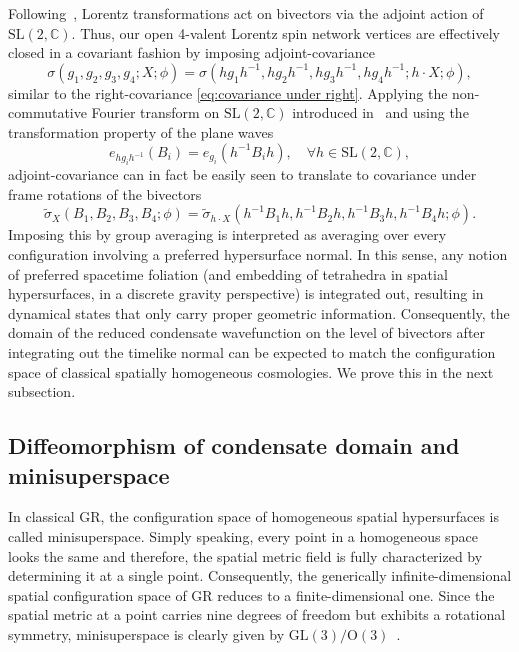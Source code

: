 \documentclass[11pt,a4paper]{article}
\newcommand{\C}{\mathbb C}
\newcommand{\SL}{\text{SL$(2,\C)$}}
\begin{document}
Following~\cite{Gielen:2013naa}, Lorentz transformations act on bivectors via the adjoint action of $\SL$. Thus, our open 4-valent Lorentz spin network vertices are effectively closed in a covariant fashion by imposing adjoint-covariance
%
\begin{equation}\label{eq:covariance under adjoint}
\sigma(g_1, g_2, g_3, g_4;X;\phi)
=
\sigma(hg_1 h^{-1}, hg_2 h^{-1}, hg_3 h^{-1}, hg_4 h^{-1};h\cdot X;\phi),
\end{equation}
%
similar to the right-covariance \eqref{eq:covariance under right}. Applying the non-commutative Fourier transform on $\SL$ introduced in~\cite{Oriti:2018bwr} and using the transformation property of the plane waves
%
\begin{equation}\label{eq:adjoint on group is adoint on bivectors}
e_{hg_ih^{-1}}(B_i)
=
e_{g_i}(h^{-1} B_i h),\quad\forall h\in\SL,
\end{equation}
%
adjoint-covariance can in fact be easily seen to translate to covariance under frame rotations of the bivectors
%
\begin{equation}
\tilde{\sigma}_X(B_1, B_2, B_3, B_4;\phi)
=
\tilde{\sigma}_{h\cdot X}(h^{-1}B_1 h, h^{-1}B_2 h, h^{-1}B_3 h, h^{-1}B_4 h;\phi).
\end{equation}
%
Imposing this by group averaging is interpreted as averaging over every configuration involving a preferred hypersurface normal. In this sense, any notion of preferred spacetime foliation (and embedding of tetrahedra in spatial hypersurfaces, in a discrete gravity perspective) is integrated out, resulting in dynamical states that only carry proper geometric information. Consequently, the domain of the reduced condensate wavefunction on the level of bivectors after integrating out the timelike normal can be expected to match the configuration space of classical spatially homogeneous cosmologies. We prove this in the next subsection.

\subsection{Diffeomorphism of condensate domain and minisuperspace}\label{subsec:Isomorphism of Domain and Minisuperspace}

In classical GR, the configuration space of homogeneous spatial hypersurfaces is called minisuperspace. Simply speaking, every point in a homogeneous space looks the same and therefore, the spatial metric field is fully characterized by determining it at a single point. Consequently, the generically infinite-dimensional spatial configuration space of GR reduces to a finite-dimensional one. Since the spatial metric at a point carries nine degrees of freedom but exhibits a rotational symmetry, minisuperspace is clearly given by $\textrm{GL}(3)/\textrm{O}(3)$~\cite{Giulini:2009np}.
\end{document}
